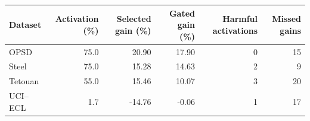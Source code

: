 \begin{tabular}{lrrrrr}
\toprule
Dataset & Activation (\%) & Selected gain (\%) & Gated gain (\%) & Harmful activations & Missed gains \\
\midrule
OPSD & 75.0 & 20.90 & 17.90 & 0 & 15 \\ 
Steel & 75.0 & 15.28 & 14.63 & 2 & 9 \\ 
Tetouan & 55.0 & 15.46 & 10.07 & 3 & 20 \\ 
UCI--ECL & 1.7 & -14.76 & -0.06 & 1 & 17 \\ 
\bottomrule
\end{tabular}

